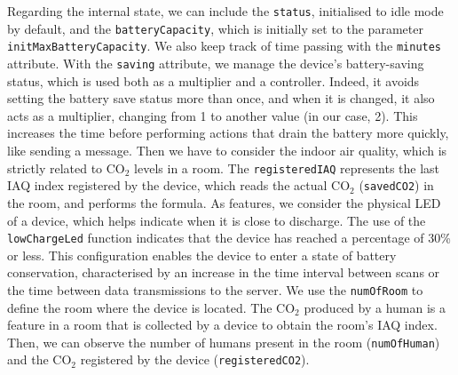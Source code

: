 \documentclass[runningheads]{llncs}
\begin{document}
Regarding the internal state, we can include the \lstinline{status}, initialised to idle mode by default, and the \lstinline{batteryCapacity}, which is initially set to the parameter \lstinline{initMaxBatteryCapacity}. 
%
We also keep track of time passing with the \lstinline{minutes} attribute. 
%
With the \lstinline{saving} attribute, we manage the device's battery-saving status, which is used both as a multiplier and a controller. 
%
Indeed, it avoids setting the battery save status more than once, and when it is changed, it also acts as a multiplier, changing from 1 to another value (in our case, 2). This increases the time before performing actions that drain the battery more quickly, like sending a message.
%
Then we have to consider the indoor air quality, which is strictly related to CO$_2$ levels in a room. The \lstinline{registeredIAQ} represents the last IAQ index registered by the device, which reads the actual CO$_2$ (\lstinline{savedCO2}) in the room, and performs the formula. 
%
As features, we consider the physical LED of a device, which helps indicate when it is close to discharge. The use of the \lstinline{lowChargeLed} function indicates that the device has reached a percentage of 30\% or less. This configuration enables the device to enter a state of battery conservation, characterised by an increase in the time interval between scans or the time between data transmissions to the server.
%
We use the \lstinline{numOfRoom} to define the room where the device is located.
%
The CO$_2$ produced by a human is a feature in a room that is collected by a device to obtain the room's IAQ index.
%
Then, we can observe the number of humans present in the room (\lstinline{numOfHuman}) and the CO$_2$ registered by the device (\lstinline{registeredCO2}).
\end{document}
